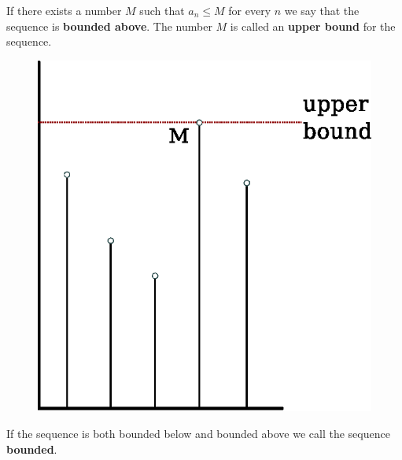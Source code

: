 \begin{defn}
  If there exists a number $M$ such that $a_n \leq M$ for every $n$ we say that the sequence is \textbf{bounded above}.
  The number $M$ is called an \textbf{upper bound} for the sequence.
  \begin{figure}[h]
    \begin{center}
      \includegraphics[scale=0.5]{continuous/sequence/uprbnd.eps}
    \end{center}
  \end{figure}
\end{defn}
\begin{defn}
  If the sequence is both bounded below and bounded above we call the sequence \textbf{bounded}.
\end{defn}
